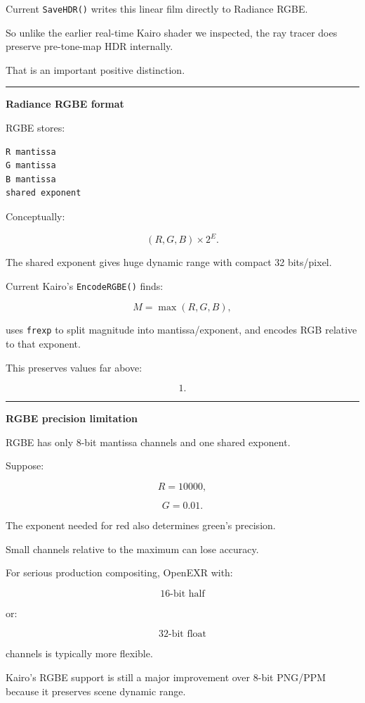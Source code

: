 Current \texttt{SaveHDR()} writes this linear film directly to Radiance RGBE.

So unlike the earlier real-time Kairo shader we inspected, the ray tracer does preserve pre-tone-map HDR internally.

That is an important positive distinction.

\begin{center}\rule{0.5\linewidth}{0.5pt}\end{center}

\textbf{Radiance RGBE format}

RGBE stores:

\begin{verbatim}
R mantissa
G mantissa
B mantissa
shared exponent
\end{verbatim}

Conceptually:

\[
(R,G,B)\times2^E.
\]

The shared exponent gives huge dynamic range with compact 32 bits/pixel.

Current Kairo's \texttt{EncodeRGBE()} finds:

\[
M=\max(R,G,B),
\]

uses \texttt{frexp} to split magnitude into mantissa/exponent, and encodes RGB relative to that exponent.

This preserves values far above:

\[
1.
\]

\begin{center}\rule{0.5\linewidth}{0.5pt}\end{center}

\textbf{RGBE precision limitation}

RGBE has only 8-bit mantissa channels and one shared exponent.

Suppose:

\[
R=10000,
\]

\[
G=0.01.
\]

The exponent needed for red also determines green's precision.

Small channels relative to the maximum can lose accuracy.

For serious production compositing, OpenEXR with:

\[
16\text{-bit half}
\]

or:

\[
32\text{-bit float}
\]

channels is typically more flexible.

Kairo's RGBE support is still a major improvement over 8-bit PNG/PPM because it preserves scene dynamic range.

